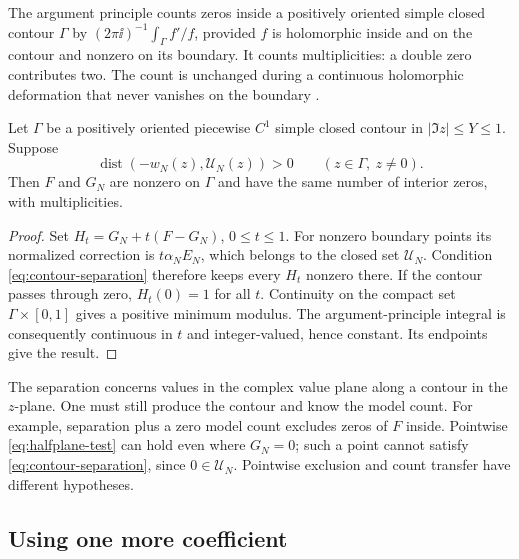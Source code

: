 The argument principle counts zeros inside a positively oriented
simple closed contour \(\Gamma\) by
\((2\pi\ii)^{-1}\int_\Gamma f'/f\), provided \(f\) is holomorphic
inside and on the contour and nonzero on its boundary. It counts
multiplicities: a double zero contributes two. The count is unchanged
during a continuous holomorphic deformation that never vanishes on
the boundary \cite[\S9.8]{topping}.

\begin{theorem}
\label{thm:contour}
Let \(\Gamma\) be a positively oriented piecewise \(C^1\) simple
closed contour in \(|\Im z|\le Y\le1\). Suppose
\begin{equation}
 \operatorname{dist}(-w_N(z),\mathcal U_N(z))>0
       \qquad(z\in\Gamma,\ z\ne0).
 \label{eq:contour-separation}
\end{equation}
Then \(F\) and \(G_N\) are nonzero on \(\Gamma\) and have the
same number of interior zeros, with multiplicities.
\end{theorem}

\begin{proof}
Set \(H_t=G_N+t(F-G_N)\), \(0\le t\le1\). For nonzero boundary
points its normalized correction is \(t\alpha_NE_N\), which
belongs to the closed set \(\mathcal U_N\). Condition
\eqref{eq:contour-separation} therefore keeps every \(H_t\)
nonzero there. If the contour passes through zero,
\(H_t(0)=1\) for all \(t\). Continuity on the compact set
\(\Gamma\times[0,1]\) gives a positive minimum modulus.
The argument-principle integral is consequently continuous in \(t\)
and integer-valued, hence constant. Its endpoints give the result.
\end{proof}

The separation concerns values in the complex value plane along a
contour in the \(z\)-plane. One must still produce the contour and
know the model count. For example, separation plus a zero model
count excludes zeros of \(F\) inside. Pointwise
\eqref{eq:halfplane-test} can hold even where \(G_N=0\); such a
point cannot satisfy \eqref{eq:contour-separation}, since
\(0\in\mathcal U_N\). Pointwise exclusion and count transfer
have different hypotheses.

\subsection{Using one more coefficient}

